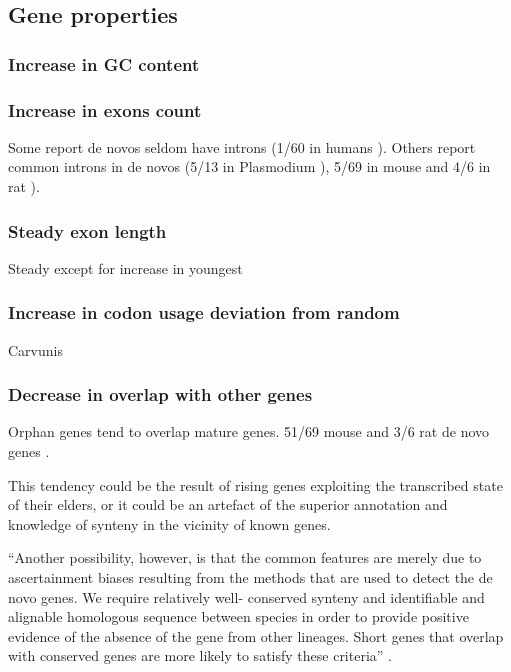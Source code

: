 \subsection{Gene properties} \subsubsection{Increase in GC content}
\subsubsection{Increase in exons count}

        Some report de novos seldom have introns (1/{60} in humans
        \cite{wu_novo_2011}). Others report common introns in de novos (5/{13}
        in Plasmodium \cite{yang_novo_2011}), 5/{69} in mouse and 4/{6} in rat
        \cite{murphy_novo_2012}).


    \subsubsection{Steady exon length}

        Steady except for increase in youngest
        \cite{neme_phylogenetic_2013}

    \subsubsection{Increase in codon usage deviation from random}

        Carvunis \cite{carvunis_proto-genes_2012}

    \subsubsection{Decrease in overlap with other genes}

        Orphan genes tend to overlap mature genes. 51/69 mouse and 3/6 rat
        de novo genes \cite{murphy_novo_2012}.

        This tendency could be the result of rising genes exploiting the
        transcribed state of their elders, or it could be an artefact of
        the superior annotation and knowledge of synteny in the vicinity of
        known genes.

        ``Another possibility, however, is that the common features are
        merely due to ascertainment biases resulting from the methods that
        are used to detect the de novo genes. We require relatively well-
        conserved synteny and identifiable and alignable homologous
        sequence between species in order to provide positive evidence of
        the absence of the gene from other lineages. Short genes that
        overlap with conserved genes are more likely to satisfy these
        criteria'' \cite[pp. 8]{murphy_novo_2012}.

